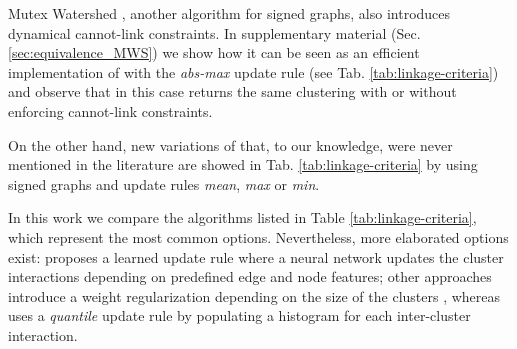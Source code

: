 Mutex Watershed \cite{wolf2018mutex}, another algorithm for signed graphs, also introduces dynamical cannot-link constraints. In supplementary material (Sec. \ref{sec:equivalence_MWS}) we show how it can be seen as an efficient implementation of \algname{} with the \emph{abs-max} update rule (see Tab. \ref{tab:linkage-criteria}) and observe that in this case \algname{} returns the same clustering with or without enforcing cannot-link constraints.

On the other hand, new variations of \algname{} that, to our knowledge, were never mentioned in the literature are showed in Tab. \ref{tab:linkage-criteria} by using signed graphs and update rules \emph{mean}, \emph{max} or \emph{min}. 

In this work we compare the algorithms listed in Table \ref{tab:linkage-criteria}, which represent the most common options. 
Nevertheless, more elaborated options exist: \cite{nunez2013machine} proposes a learned update rule where a neural network updates the cluster interactions depending on predefined edge and node features; other approaches introduce a weight regularization depending on the size of the clusters \cite{felzenszwalb2004efficient,kardoostsolving}, whereas 
\cite{funke2018large} uses a \emph{quantile} update rule by populating a histogram for each inter-cluster interaction.

